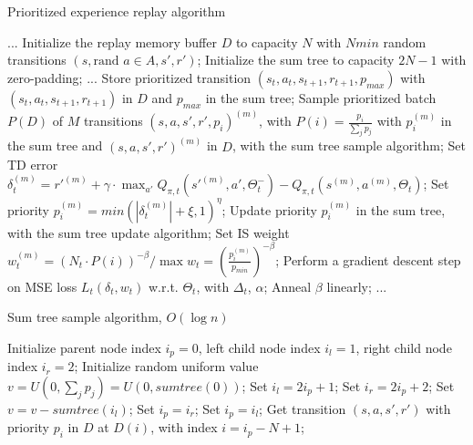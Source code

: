\begin{algorithm}[H]
\small
\caption*{Prioritized experience replay algorithm}
\begin{algorithmic}
    \STATE ...
    \STATE Initialize the replay memory buffer $D$ to capacity $N$
    \STATE with $Nmin$ random transitions $(s,\text{rand }a \in A,s',r')$;
    \STATE Initialize the sum tree to capacity $2N - 1$ with zero-padding;
        \bindent
        \STATE ...
        \STATE Store prioritized transition $(s_t,a_t,s_{t+1},r_{t+1}, p_{max})$
        \STATE with $(s_t,a_t,s_{t+1},r_{t+1})$ in $D$ and $p_{max}$ in the sum tree;
        \STATE Sample prioritized batch $P(D)$ of $M$ transitions $(s,a,s',r',p_i)^{(m)}$, with $P(i) = \frac{p_i}{\sum_j p_j}$
        \STATE with $p_i^{(m)}$ in the sum tree and $(s,a,s',r')^{(m)}$ in $D$, with the sum tree sample algorithm;
            \bindent
            \STATE Set TD error $\delta^{(m)}_t = r'^{(m)} + \gamma \cdot \max_{a'}Q_{\pi,t}(s'^{(m)},a',\Theta^-_t) - Q_{\pi,t}(s^{(m)},a^{(m)},\Theta_t)$;
            \STATE Set priority $p_i^{(m)}= min(|\delta^{(m)}_t| + \xi, 1)^{\eta}$;
            \STATE Update priority $p_i^{(m)}$ in the sum tree, with the sum tree update algorithm;
            \STATE Set IS weight $w_{t}^{(m)} = (N_t \cdot P(i))^{-\beta} / \max w_{t} = (\frac{p_i^{(m)}}{p_{min}})^{-\beta}$;
            \eindent
        \ENDFOR
        \STATE Perform a gradient descent step on MSE loss $L_t(\delta_t,w_t)$ w.r.t. $\Theta_t$, with
        $\Delta_t$, $\alpha$;
        \STATE Anneal $\beta$ linearly;
        \STATE ...
    \ENDFOR
\end{algorithmic}
\end{algorithm}

\begin{algorithm}[H]
\small
\caption*{Sum tree sample algorithm, $O(\log n)$}
\begin{algorithmic}
    \STATE Initialize parent node index $i_p = 0$, left child node index $i_l = 1$, right child node index $i_r=2$;
    \STATE Initialize random uniform value $v = U(0, \sum_j p_j) = U(0, sumtree(0))$;
        \bindent
        \STATE Set $i_l = 2i_p+1$;
        \STATE Set $i_r = 2i_p+2$;
            \STATE Set $v = v - sumtree(i_l)$;
            \STATE Set $i_p = i_r$;
        \ELSE
            \STATE Set $i_p = i_l$; 
        \ENDIF
        \eindent
    \ENDWHILE
    \STATE Get transition $(s,a,s',r')$ with priority $p_i$ in $D$ at $D(i)$, with index $i=i_p - N + 1$;
\end{algorithmic}
\end{algorithm}

